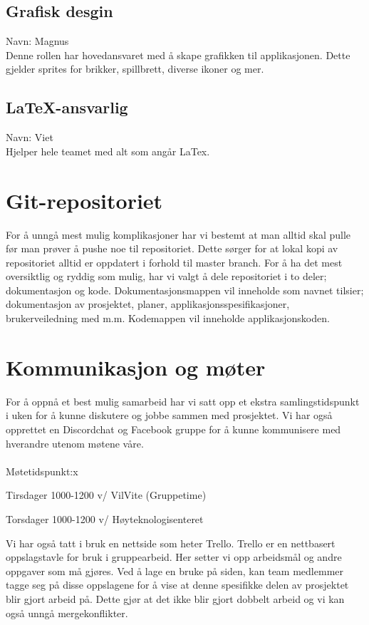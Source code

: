 \documentclass{article}
\begin{document}
\subsection*{Grafisk desgin}
Navn: Magnus\\
Denne rollen har hovedansvaret med å skape grafikken til applikasjonen. Dette gjelder sprites for brikker, spillbrett, diverse ikoner og mer.

\subsection*{LaTeX-ansvarlig}
Navn: Viet\\
Hjelper hele teamet med alt som angår LaTex.

\section*{Git-repositoriet}
For å unngå mest mulig komplikasjoner har vi bestemt at man alltid skal pulle før man prøver å pushe noe til repositoriet. Dette sørger for at lokal kopi av repositoriet alltid er oppdatert i forhold til master branch. For å ha det mest oversiktlig og ryddig som mulig, har vi valgt å dele repositoriet i to deler; dokumentasjon og kode. Dokumentasjonsmappen vil inneholde som navnet tilsier; dokumentasjon av prosjektet, planer, applikasjonsspesifikasjoner, brukerveiledning med m.m. Kodemappen vil inneholde applikasjonskoden.

\section*{Kommunikasjon og møter}
For å oppnå et best mulig samarbeid har vi satt opp et ekstra samlingstidspunkt i uken for å kunne diskutere og jobbe sammen med prosjektet. Vi har også opprettet en Discordchat og Facebook gruppe for å kunne kommunisere med hverandre utenom møtene våre.\\\\
Møtetidspunkt:x
			\begin{list}{-}{}
				\item Tirsdager 1000-1200 v/ VilVite (Gruppetime) 
				\item Torsdager 1000-1200 v/ Høyteknologisenteret
			\end{list}

Vi har også tatt i bruk en nettside som heter Trello. Trello er en nettbasert oppslagstavle for bruk i gruppearbeid. Her setter vi opp arbeidsmål og andre oppgaver som må gjøres. Ved å lage en bruke på siden, kan team medlemmer tagge seg på disse oppslagene for å vise at denne spesifikke delen av prosjektet blir gjort arbeid på. Dette gjør at det ikke blir gjort dobbelt arbeid og vi kan også unngå mergekonflikter.
\end{document}
